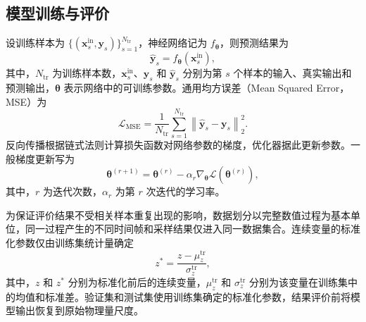 \subsection{模型训练与评价}
\label{subsec:ch2_training}

设训练样本为 $\{(\boldsymbol{x}_s^{\mathrm{in}},\boldsymbol{y}_s)\}_{s=1}^{N_{\mathrm{tr}}}$，神经网络记为 $f_{\boldsymbol{\theta}}$，则预测结果为
\begin{equation}
\widehat{\boldsymbol{y}}_s
=
f_{\boldsymbol{\theta}}\left(\boldsymbol{x}_s^{\mathrm{in}}\right),
\label{eq:ch2_network_mapping}
\end{equation}
其中，$N_{\mathrm{tr}}$ 为训练样本数，$\boldsymbol{x}_s^{\mathrm{in}}$、$\boldsymbol{y}_s$ 和 $\widehat{\boldsymbol{y}}_s$ 分别为第 $s$ 个样本的输入、真实输出和预测输出，$\boldsymbol{\theta}$ 表示网络中的可训练参数。通用均方误差（Mean Squared Error，MSE）为
\begin{equation}
\mathcal{L}_{\mathrm{MSE}}
=
\frac{1}{N_{\mathrm{tr}}}
\sum_{s=1}^{N_{\mathrm{tr}}}
\left\|
\widehat{\boldsymbol{y}}_s
-
\boldsymbol{y}_s
\right\|_2^2.
\label{eq:ch2_mse}
\end{equation}
反向传播根据链式法则计算损失函数对网络参数的梯度，优化器据此更新参数\cite{rumelhart1986backpropagation}。一般梯度更新写为
\begin{equation}
\boldsymbol{\theta}^{(r+1)}
=
\boldsymbol{\theta}^{(r)}
-
\alpha_r
\nabla_{\boldsymbol{\theta}}
\mathcal{L}\left(\boldsymbol{\theta}^{(r)}\right),
\label{eq:ch2_parameter_update}
\end{equation}
其中，$r$ 为迭代次数，$\alpha_r$ 为第 $r$ 次迭代的学习率。

为保证评价结果不受相关样本重复出现的影响，数据划分以完整数值过程为基本单位，同一过程产生的不同时间帧和采样结果仅进入同一数据集合。连续变量的标准化参数仅由训练集统计量确定
\begin{equation}
z^{\ast}
=
\frac{z-\mu_z^{\mathrm{tr}}}{\sigma_z^{\mathrm{tr}}},
\label{eq:ch2_standardization}
\end{equation}
其中，$z$ 和 $z^{\ast}$ 分别为标准化前后的连续变量，$\mu_z^{\mathrm{tr}}$ 和 $\sigma_z^{\mathrm{tr}}$ 分别为该变量在训练集中的均值和标准差。验证集和测试集使用训练集确定的标准化参数，结果评价前将模型输出恢复到原始物理量尺度。

